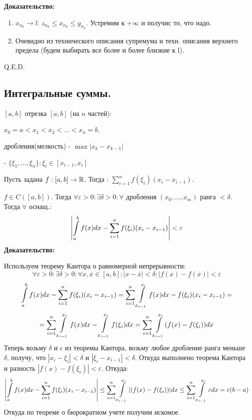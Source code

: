 \textbf{Доказательство:}

\begin{enumerate}
    \item $x_{n_k} \rightarrow l$: $z_{n_k}\leq x_{n_k}\leq y_{n_k}$. Устремим к $+\infty$ и получис то, что надо.
    \item Очевидно из технического описания супремума и техн. описания верхнего предела (будем выбирать все более и более близкие к l).
\end{enumerate}

\hfill Q.E.D.



\newpage
\subsection{Интегральные суммы.}

 $[a,b]$  отрезка $[a,b]$ (на $n$ частей):

$x_0 = a <x_1<x_2<\ldots <x_n=b$.

 дробления(мелкость) - $\max |x_k-x_{k-1}|$

 - $\{\xi_1,\ldots, \xi_n\}: \xi_i \in [x_{i-1},x_i]$

Пусть задана $f:[a,b] \rightarrow \mathbb{R}$. Тогда : $\sum\limits_{i=1}^n f(\xi_i)(x_i-x_{i-1})$.


$f\in C([a,b])$. Тогда $\forall \varepsilon >0: \exists \delta >0 : \forall$ дробления $(x_0,\ldots,x_m)$ ранга $< \delta$. Тогда $\forall$ оснащ.:
$$\left|\displaystyle\int\limits_{a}^{b}f(x)dx - \sum\limits_{i=1}^nf(\xi_i) (x_i-x_{i-1})\right|<\varepsilon$$
\textbf{Доказательство:}

Используем теорему Кантора о равномерной непрерывности: $$\forall \varepsilon> 0: \exists \delta >0: \forall x,\overline{x} \in [a,b]: |x-\overline{x}|<\delta: |f(x) - f(\overline{x})|<\varepsilon$$
$$\displaystyle\int\limits_{a}^{b}f(x)dx - \sum\limits_{i=1}^nf(\xi_i)(x_i-x_{i-1})= \sum\limits_{i=1}^n \displaystyle\int\limits_{x_{i-1}}^{x_i}f(x)dx - f(\xi_i)(x_i-x_{i-1}) = $$
$$=\sum\limits_{i=1}^n \displaystyle\int\limits_{x_{i-1}}^{x_i}f(x)dx - \displaystyle\int\limits_{x_{i-1}}^{x_i}f(\xi_i)dx  = \sum\limits_{i=1}^n \displaystyle\int\limits_{x_{i-1}}^{x_i}(f(x) - f(\xi_i))dx $$
Теперь возьму $\delta$ и $\epsilon$ из теоремы Кантора, возьму любое дробление ранга меньше $\delta$, получу, что $|x_i-\xi_i|<\delta$ и $|\xi_i- x_{i-1}|<\delta$. Откуда выполнено теорема Кантора и разность $|f(x)-f(\xi_i)|<\varepsilon$. Откуда:
$$\left|\displaystyle\int\limits_{a}^{b}f(x)dx - \sum\limits_{i=1}^nf(\xi_i) (x_i-x_{i-1})\right| \leq \sum\limits_{i=1}^n \displaystyle\int\limits_{x_{i-1}}^{x_i}|(f(x) - f(\xi_i))|dx\leq \sum\limits_{i=1}^n \displaystyle\int\limits_{x_{i-1}}^{x_i}\varepsilon dx = \varepsilon(b-a)$$
Откуда по теореме о бюрократном учете получим искомое.

